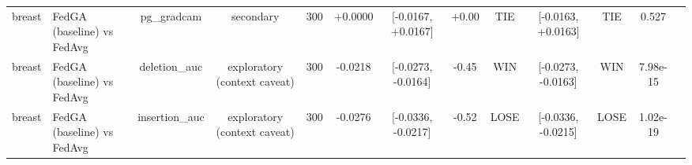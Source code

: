 \begin{tabular}{llccccccccccc}
breast & FedGA (baseline) vs FedAvg & pg\_gradcam & secondary & 300 & +0.0000 & [-0.0167, +0.0167] & +0.00 & TIE & [-0.0163, +0.0163] & TIE & 0.527 &  \\
breast & FedGA (baseline) vs FedAvg & deletion\_auc & exploratory (context caveat) & 300 & -0.0218 & [-0.0273, -0.0164] & -0.45 & WIN & [-0.0273, -0.0163] & WIN & 7.98e-15 &  \\
breast & FedGA (baseline) vs FedAvg & insertion\_auc & exploratory (context caveat) & 300 & -0.0276 & [-0.0336, -0.0217] & -0.52 & LOSE & [-0.0336, -0.0215] & LOSE & 1.02e-19 &  \\
\hline
\end{tabular}
